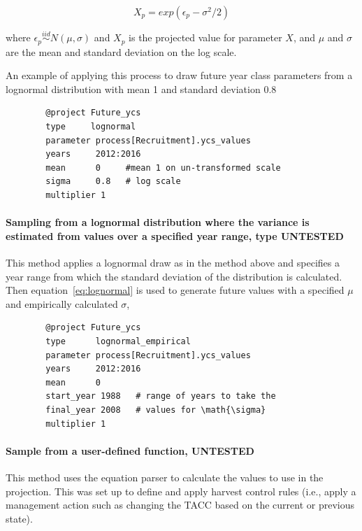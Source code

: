 \begin{equation}\label{eq:lognormal}
X_p = exp(\epsilon_p - \sigma^2 / 2)
\end{equation}

where $\epsilon_p\stackrel{iid}{\sim}N(\mu,\sigma)$ and $X_p$ is the projected value for parameter $X$, and $\mu$ and $\sigma$ are the mean and standard deviation on the log scale.

An example of applying this process to draw future year class parameters from a lognormal distribution with mean 1 and standard deviation 0.8

{\small{\begin{verbatim}
		@project Future_ycs
		type     lognormal
		parameter process[Recruitment].ycs_values
		years     2012:2016
		mean      0     #mean 1 on un-transformed scale
		sigma     0.8   # log scale
		multiplier 1
		\end{verbatim}}}

\paragraph[Lognormal-Empirical]{Sampling from a lognormal distribution where the  variance is estimated from values over a specified year range, type   UNTESTED}

This method applies a lognormal draw as in the  method above and specifies a year range from which the standard deviation of the distribution is calculated. Then equation~\eqref{eq:lognormal} is used to generate future values with a specified $\mu$ and empirically calculated $\sigma$,

{\small{\begin{verbatim}
		@project Future_ycs
		type      lognormal_empirical
		parameter process[Recruitment].ycs_values
		years     2012:2016
		mean      0
		start_year 1988   # range of years to take the 
		final_year 2008   # values for \math{\sigma}
		multiplier 1
		\end{verbatim}}}

\paragraph[User Defined]{Sample from a user-defined function,   UNTESTED}

This method uses the equation parser to calculate the values to use in the projection. This was set up to define and apply harvest control rules (i.e., apply a management action such as changing the TACC based on the current or previous state).

